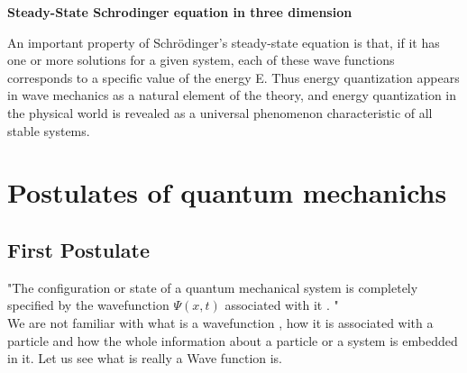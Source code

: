 \textbf{Steady-State Schrodinger equation in three dimension}  \\
\begin{center}
\end{center}
An important property of Schrödinger's steady-state equation is that, if it has one or more solutions for a given system, each of these wave functions corresponds to a specific value of the energy E. Thus energy quantization appears in wave mechanics as a natural element of the theory, and energy quantization in the physical world is revealed as a universal phenomenon characteristic of all stable systems.
\section{Postulates of quantum mechanichs}
\subsection{First Postulate}
"The configuration or state of a quantum mechanical system is completely specified by  the wavefunction  ${\Psi(x,t)}$ associated with it . "
\newline
\\We are not familiar with what is a wavefunction , how it is associated with a particle and how the whole information about a particle or a system is embedded in it. Let us see what is really a Wave function is.
